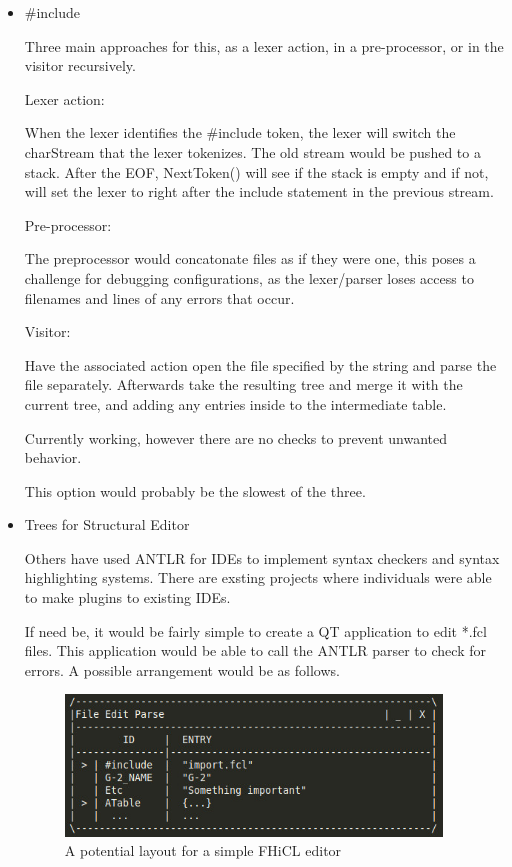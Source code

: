 \documentclass{article}
\begin{document}
\begin{itemize}
  \item \#include
    
    \quad Three main approaches for this, as a lexer action, in a pre-processor, or in the visitor recursively. 

        Lexer action:

            \quad When the lexer identifies the \#include token, the lexer will switch the charStream that the lexer tokenizes. The old stream would be pushed to a stack. After the EOF, NextToken() will see if the stack is empty and if not, will set the lexer to right after the include statement in the previous stream. 

        Pre-processor:

            \quad The preprocessor would concatonate files as if they were one, this poses a challenge for debugging configurations, as the lexer/parser loses access to filenames and lines of any errors that occur.

        Visitor:

            \quad Have the associated action open the file specified by the string and parse the file separately. Afterwards take the resulting tree and merge it with the current tree, and adding any entries inside to the intermediate table.

            Currently working, however there are no checks to prevent unwanted behavior.

            This option would probably be the slowest of the three.

  \item Trees for Structural Editor

    \quad Others have used ANTLR for IDEs to implement syntax checkers and syntax highlighting systems. There are exsting projects where individuals were able to make plugins to existing IDEs.

    If need be, it would be fairly simple to create a QT application to edit *.fcl files. This application would be able to call the ANTLR parser to check for errors. A possible arrangement would be as follows.


      \begin{figure}[!ht]
        \begin{center}
          \includegraphics[width=10cm]{exampleLayout.jpg}
          \caption{A potential layout for a simple FHiCL editor}
          \label{exampleLayout}
        \end{center}
      \end{figure}


\end{itemize}
\end{document}
